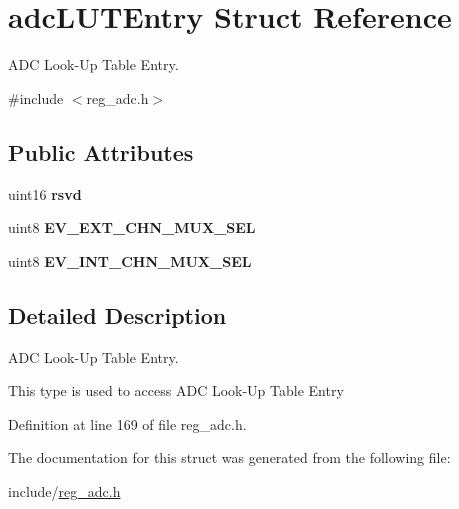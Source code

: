 \hypertarget{structadcLUTEntry}{}\section{adc\+L\+U\+T\+Entry Struct Reference}
\label{structadcLUTEntry}


A\+DC Look-\/\+Up Table Entry.  




{\ttfamily \#include $<$reg\+\_\+adc.\+h$>$}

\subsection*{Public Attributes}
\begin{DoxyCompactItemize}
\item 
\mbox{\label{structadcLUTEntry_a09f1d5ea427799d22f98053cb4192080}} 
uint16 {\bfseries rsvd}
\item 
\mbox{\label{structadcLUTEntry_a68e5bbe48cb51d3f538327d1b0a4d8d1}} 
uint8 {\bfseries E\+V\+\_\+\+E\+X\+T\+\_\+\+C\+H\+N\+\_\+\+M\+U\+X\+\_\+\+S\+EL}
\item 
\mbox{\label{structadcLUTEntry_a7bcb4068b0759d431364bae1606ff054}} 
uint8 {\bfseries E\+V\+\_\+\+I\+N\+T\+\_\+\+C\+H\+N\+\_\+\+M\+U\+X\+\_\+\+S\+EL}
\end{DoxyCompactItemize}


\subsection{Detailed Description}
A\+DC Look-\/\+Up Table Entry. 

This type is used to access A\+DC Look-\/\+Up Table Entry 

Definition at line 169 of file reg\+\_\+adc.\+h.



The documentation for this struct was generated from the following file\+:\begin{DoxyCompactItemize}
\item 
include/\mbox{\hyperlink{reg__adc_8h}{reg\+\_\+adc.\+h}}\end{DoxyCompactItemize}
